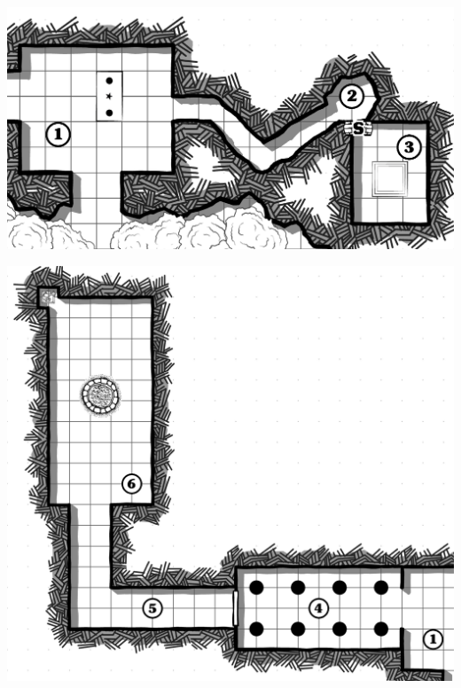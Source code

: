 \vfill
\includegraphics[width=\linewidth]{pics/map_1-3.png}

\includegraphics[width=\linewidth]{pics/map_4-6.png}
